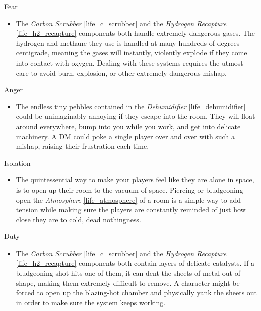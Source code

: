 \documentclass[a4paper]{article}
\begin{document}
\vspace{0.3cm}
\begin{minipage}[t]{0.4\linewidth}
Fear
\begin{itemize}
\item The \textit{Carbon Scrubber} \ref{life_c_scrubber} and the \textit{Hydrogen Recapture} \ref{life_h2_recapture} components both handle extremely dangerous gases. The hydrogen and methane they use is handled at many hundreds of degrees centigrade, meaning the gases will instantly, violently explode if they come into contact with oxygen. Dealing with these systems requires the utmost care to avoid burn, explosion, or other extremely dangerous mishap.
\end{itemize}
\end{minipage} 
\begin{minipage}[t]{0.4\linewidth}
Anger
\begin{itemize}
\item The endless tiny pebbles contained in the \textit{Dehumidifier} \ref{life_dehumidifier} could be unimaginably annoying if they escape into the room. They will float around everywhere, bump into you while you work, and get into delicate machinery. A DM could poke a single player over and over with such a mishap, raising their frustration each time.
\end{itemize}
\end{minipage}

\begin{minipage}[t]{0.4\linewidth}
Isolation
\begin{itemize}
\item The quintessential way to make your players feel like they are alone in space, is to open up their room to the vacuum of space. Piercing or bludgeoning open the \textit{Atmosphere} \ref{life_atmosphere} of a room is a simple way to add tension while making sure the players are constantly reminded of just how close they are to cold, dead nothingness.
\end{itemize}
\end{minipage}
\begin{minipage}[t]{0.4\linewidth}
Duty
\begin{itemize}
\item The \textit{Carbon Scrubber} \ref{life_c_scrubber} and the \textit{Hydrogen Recapture} \ref{life_h2_recapture} components both contain layers of delicate catalysts. If a bludgeoning shot hits one of them, it can dent the sheets of metal out of shape, making them extremely difficult to remove. A character might be forced to open up the blazing-hot chamber and physically yank the sheets out in order to make sure the system keeps working.
\end{itemize}
\end{minipage}
\end{document}
